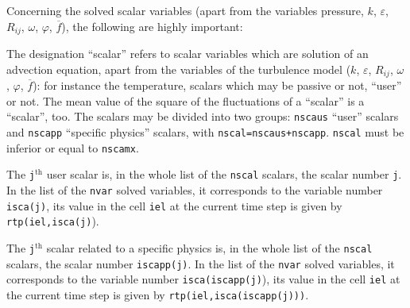 {{{Concerning the solved scalar variables (apart from the variables
pressure, $k$, $\varepsilon$, $R_{ij}$, $\omega$, $\varphi$,
$\overline{f}$), the following are highly important:
\begin{list}{-}{}
\item The designation ``scalar'' refers to scalar variables which are
      solution of an advection equation, apart from the variables of the
      turbulence model  ($k$, $\varepsilon$, $R_{ij}$, $\omega$,
      $\varphi$, $\overline{f}$): for instance the temperature, scalars
      which may be passive or not, ``user'' or not. The mean value of
      the square of the fluctuations of a ``scalar'' is a
      ``scalar'', too. The scalars may be divided into two groups:
      \texttt{nscaus} ``user'' scalars and \texttt{nscapp}
      ``specific physics'' scalars, with
      \texttt{nscal=nscaus+nscapp}. \texttt{nscal} must be inferior or
       equal to \texttt{nscamx}.
\item The \texttt{j}$^{\text{th}}$ user scalar is, in
      the whole list of the \texttt{nscal} scalars, the scalar number
      \texttt{j}. In the list of the \texttt{nvar} solved variables, it
      corresponds to the variable number \texttt{isca(j)},
      its value in the cell \texttt{iel} at the current time step is given by
      \texttt{rtp(iel,isca(j)}).
\item The \texttt{j}$^{\text{th}}$ scalar related to a specific physics is, in
      the whole list of the \texttt{nscal} scalars, the scalar number
      \texttt{iscapp(j)}. In the list of the \texttt{nvar} solved variables, it
      corresponds to the variable number
      \texttt{isca(iscapp(j)}),
      its value in the cell \texttt{iel} at the current time step is given by
      \texttt{rtp(iel,isca(iscapp(j)))}.


\end{list}}}}
